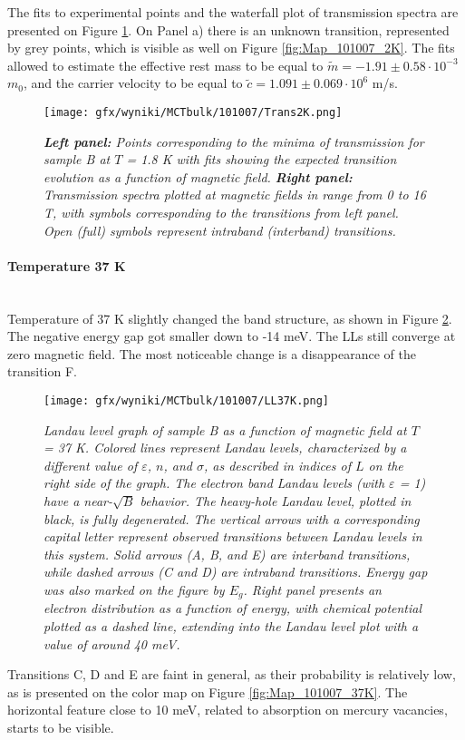 \documentclass[titlepage,a4paper]{book}
\newcommand{\wciecie}{\quad\phantom{v}}
\newcommand{\myparagraph}[1]{\paragraph{#1}\mbox{}\\}
\begin{document}
The fits to experimental points and the waterfall plot of transmission spectra are presented on Figure \ref{fig:Spectra_101007_2K}. On Panel a) there is an unknown transition, represented by grey points, which is visible as well on Figure \ref{fig:Map_101007_2K}. The fits allowed to estimate the effective rest mass to be equal to $\tilde m = -1.91 \pm 0.58 \cdot 10^{-3}$ $m_0$, and the carrier velocity to be equal to $\tilde{c} = 1.091 \pm 0.069 \cdot 10^6$ m/s. 

\begin{figure}[ht]
	\centering
	\texttt{[image: gfx/wyniki/MCTbulk/101007/Trans2K.png]}
	\vspace{-10pt}
	\caption{\textit{\textbf{Left panel:} Points corresponding to the minima of transmission for sample B at $T$ = 1.8 K with fits showing the expected transition evolution as a function of magnetic field. \textbf{Right panel:} Transmission spectra plotted at magnetic fields in range from 0 to 16 T, with symbols corresponding to the transitions from left panel. Open (full) symbols represent intraband (interband) transitions.}}
	\label{fig:Spectra_101007_2K}
\end{figure} 

\newpage
\myparagraph{Temperature 37 K}
\wciecie
Temperature of 37 K slightly changed the band structure, as shown in Figure \ref{fig:LL_101007_37K}. The negative energy gap got smaller down to -14 meV. The LLs still converge at zero magnetic field. The most noticeable change is a disappearance of the transition F. 

\begin{figure}[ht]
	\centering
	\texttt{[image: gfx/wyniki/MCTbulk/101007/LL37K.png]}
	\vspace{-10pt}
	\caption{\textit{Landau level graph of sample B as a function of magnetic field at $T$ = 37 K. Colored lines represent Landau levels, characterized by a different value of $\varepsilon$, $n$, and $\sigma$, as described in indices of $L$ on the right side of the graph. The electron band Landau levels (with $\varepsilon$ = 1) have a near-$\sqrt{B}$ behavior. The heavy-hole Landau level, plotted in black, is fully degenerated. The vertical arrows with a corresponding capital letter represent observed transitions between Landau levels in this system. Solid arrows (A, B, and E) are interband transitions, while dashed arrows (C and D) are intraband transitions. Energy gap was also marked on the figure by $E_g$. Right panel presents an electron distribution as a function of energy, with chemical potential plotted as a dashed line, extending into the Landau level plot with a value of around 40 meV.}}
	\label{fig:LL_101007_37K}
\end{figure}
Transitions C, D and E are faint in general, as their probability is relatively low, as is presented on the color map on Figure \ref{fig:Map_101007_37K}. The horizontal feature close to 10 meV, related to absorption on mercury vacancies, starts to be visible.
\end{document}
